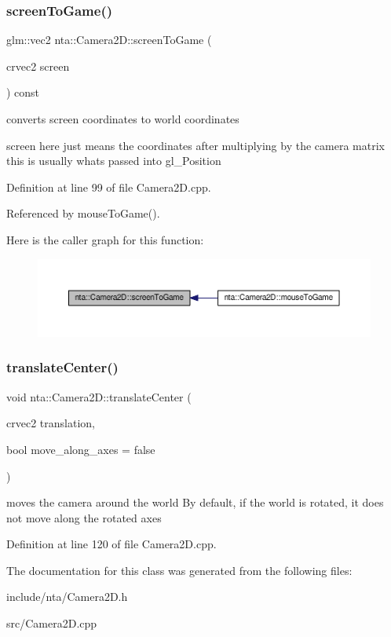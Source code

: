 \subsubsection{\texorpdfstring{screen\+To\+Game()}{screenToGame()}}
{\footnotesize\ttfamily glm\+::vec2 nta\+::\+Camera2\+D\+::screen\+To\+Game (\begin{DoxyParamCaption}\item[{crvec2}]{screen }\end{DoxyParamCaption}) const}

converts screen coordinates to world coordinates

screen here just means the coordinates after multiplying by the camera matrix this is usually what\textquotesingle{}s passed into gl\+\_\+\+Position 

Definition at line 99 of file Camera2\+D.\+cpp.



Referenced by mouse\+To\+Game().

Here is the caller graph for this function\+:
\nopagebreak
\begin{figure}[H]
\begin{center}
\leavevmode
\includegraphics[width=350pt]{d3/d28/classnta_1_1Camera2D_a8b2be32484dee689c6014cf88a6ce80a_icgraph}
\end{center}
\end{figure}
\mbox{\label{classnta_1_1Camera2D_a711b1b64b4e0bbca5c598ac15609f498}} 
\subsubsection{\texorpdfstring{translate\+Center()}{translateCenter()}}
{\footnotesize\ttfamily void nta\+::\+Camera2\+D\+::translate\+Center (\begin{DoxyParamCaption}\item[{crvec2}]{translation,  }\item[{bool}]{move\+\_\+along\+\_\+axes = {\ttfamily false} }\end{DoxyParamCaption})}

moves the camera around the world By default, if the world is rotated, it does not move along the rotated axes 

Definition at line 120 of file Camera2\+D.\+cpp.



The documentation for this class was generated from the following files\+:\begin{DoxyCompactItemize}
\item 
include/nta/Camera2\+D.\+h\item 
src/Camera2\+D.\+cpp\end{DoxyCompactItemize}
